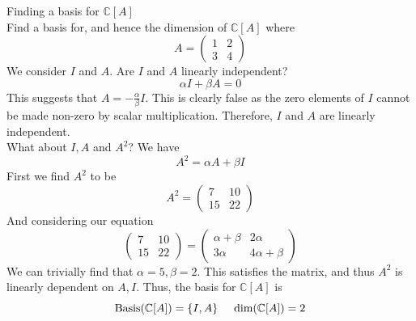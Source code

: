 \documentclass[journal, letterpaper]{IEEEtran}
\begin{document}
    \begin{myboxg}{Finding a basis for $\mathbb{C}[A]$} \\
        Find a basis for, and hence the dimension of $\mathbb{C}[A]$ where
        $$ A = \begin{pmatrix}
            1 & 2 \\ 3 & 4
        \end{pmatrix}$$
        We consider $I$ and $A$. Are $I$ and $A$ linearly independent?
        $$ \alpha I + \beta A = 0$$
        This suggests that $A = -\frac{\alpha}{\beta}I$. This is clearly false as the zero elements of $I$ cannot be made non-zero by scalar multiplication. Therefore, $I$ and $A$ are linearly independent.
        \newline \\
        What about $I, A$ and $A^2$? We have 
        $$A^2 = \alpha A + \beta I$$
        First we find $A^2$ to be
        $$ A^2 = \begin{pmatrix}
            7 & 10 \\ 15 & 22
        \end{pmatrix}$$
        And considering our equation
        $$ \begin{pmatrix}
            7 & 10 \\ 15 & 22
        \end{pmatrix} = \begin{pmatrix}
            \alpha + \beta & 2\alpha \\ 3\alpha & 4\alpha + \beta
        \end{pmatrix}$$
        We can trivially find that $\alpha = 5, \beta = 2$. This satisfies the matrix, and thus $A^2$ is linearly 
        dependent on $A, I$. Thus, the basis for $\mathbb{C}[A]$ is
        $$ \text{Basis}(\mathbb{C}[A]) = \{I, A \} \hspace{0.5cm} \text{dim}(\mathbb{C}[A]) = 2 $$
    \end{myboxg}
\end{document}
